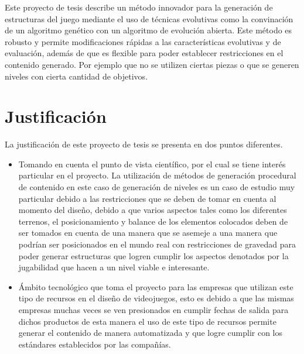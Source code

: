 Este proyecto de tesis describe un método innovador para la generación de
estructuras del juego mediante el uso de técnicas evolutivas como la convinación
de un algoritmo genético con un algoritmo de evolución abierta. Este método es
robusto y permite modificaciones rápidas a las características evolutivas y de
evaluación, además de que es flexible para poder establecer restricciones en el
contenido generado. Por ejemplo que no se utilizen ciertas piezas o que se
generen niveles con cierta cantidad de objetivos.

\section{Justificación}
\label{section:justification}

La justificación de este proyecto de tesis se presenta en dos puntos diferentes. 

\begin{itemize}
  \item Tomando en cuenta el punto de vista científico, por el cual
  se tiene interés particular en el proyecto. La utilización de métodos de
  generación procedural de contenido en este caso de generación de niveles es un
  caso de estudio muy particular debido a las restricciones que se deben de
  tomar en cuenta al momento del diseño, debido a que varios aspectos tales como
  los diferentes terrenos, el posicionamiento y balance de los elementos
  colocados deben de ser tomados en cuenta de una manera que se asemeje a una
  manera que podrían ser posicionados en el mundo real con restricciones de
  gravedad para poder generar estructuras que logren cumplir los aspectos
  denotados por la jugabilidad que hacen a un nivel viable e interesante.
  \item Ámbito tecnológico que toma el proyecto para las empresas que utilizan
  este tipo de recursos en el diseño de videojuegos, esto es debido a que las
  mismas empresas muchas veces se ven presionados en cumplir fechas de salida para
  dichos productos de esta manera el uso de este tipo de recursos permite generar
  el contenido de manera automatizada y que logre cumplir con los estándares
  establecidos por las compañías.
\end{itemize}
 


